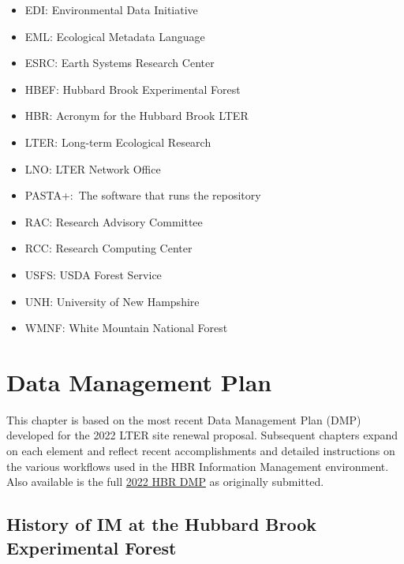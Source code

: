 \documentclass[
  letterpaper,
  DIV=11,
  numbers=noendperiod]{scrreprt}
\providecommand{\tightlist}{%
  \setlength{\itemsep}{0pt}\setlength{\parskip}{0pt}}\usepackage{longtable,booktabs,array}
\begin{document}
\begin{itemize}
\tightlist
\item
  EDI: Environmental Data Initiative\\
\item
  EML: Ecological Metadata Language\\
\item
  ESRC: Earth Systems Research Center\\
\item
  HBEF: Hubbard Brook Experimental Forest\\
\item
  HBR: Acronym for the Hubbard Brook LTER\\
\item
  LTER: Long-term Ecological Research\\
\item
  LNO: LTER Network Office\\
\item
  PASTA+:~The software that runs the repository
\item
  RAC: Research Advisory Committee\\
\item
  RCC: Research Computing Center\\
\item
  USFS: USDA Forest Service\\
\item
  UNH: University of New Hampshire\\
\item
  WMNF: White Mountain National Forest\\
\end{itemize}


\chapter{Data Management Plan}\label{data-management-plan}

This chapter is based on the most recent Data Management Plan (DMP)
developed for the 2022 LTER site renewal proposal. Subsequent chapters
expand on each element and reflect recent accomplishments and detailed
instructions on the various workflows used in the HBR Information
Management environment. Also available is the full
\href{2022_HBRSupplementalDoc_DMP-20220317.pdf}{2022 HBR DMP} as
originally submitted.

\section{History of IM at the Hubbard Brook Experimental
Forest}\label{history-of-im-at-the-hubbard-brook-experimental-forest}
\end{document}
